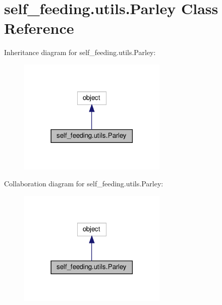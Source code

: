 \hypertarget{classself__feeding_1_1utils_1_1Parley}{}\section{self\+\_\+feeding.\+utils.\+Parley Class Reference}
\label{classself__feeding_1_1utils_1_1Parley}


Inheritance diagram for self\+\_\+feeding.\+utils.\+Parley\+:
\nopagebreak
\begin{figure}[H]
\begin{center}
\leavevmode
\includegraphics[width=201pt]{classself__feeding_1_1utils_1_1Parley__inherit__graph}
\end{center}
\end{figure}


Collaboration diagram for self\+\_\+feeding.\+utils.\+Parley\+:
\nopagebreak
\begin{figure}[H]
\begin{center}
\leavevmode
\includegraphics[width=201pt]{classself__feeding_1_1utils_1_1Parley__coll__graph}
\end{center}
\end{figure}
